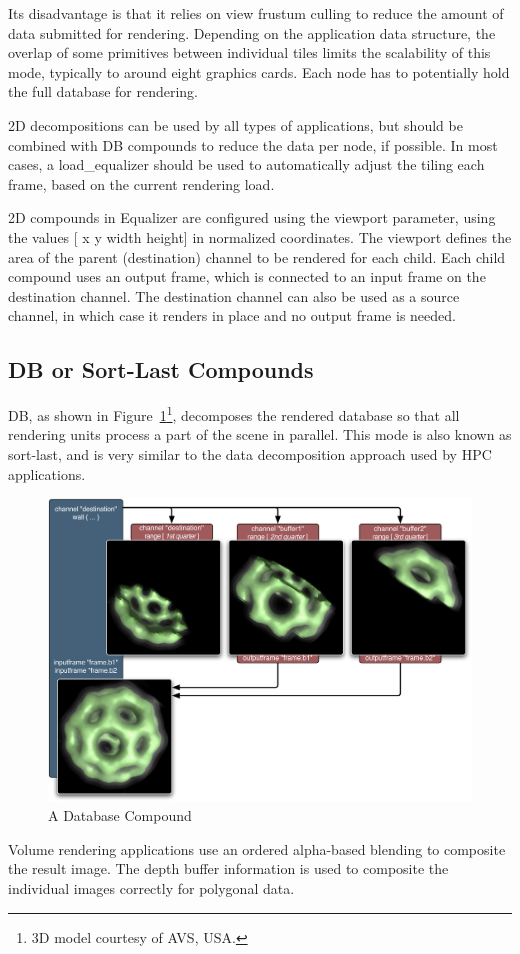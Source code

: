 \documentclass[10pt,a4]{scrartcl}
\newcommand{\fig}[1]{Figure~\ref{#1}}
\begin{document}
Its disadvantage is that it relies on view frustum culling to reduce the
amount of data submitted for rendering. Depending on the application
data structure, the overlap of some primitives between individual tiles
limits the scalability of this mode, typically to around eight graphics
cards. Each node has to potentially hold the full database for
rendering.

2D decompositions can be used by all types of applications, but should
be combined with DB compounds to reduce the data per node, if
possible. In most cases, a \textsf{load\_equalizer} should be used to
automatically adjust the tiling each frame, based on the current
rendering load.

2D compounds in Equalizer are configured using the \textsf{viewport}
parameter, using the values \textsf{[ x y width height]} in normalized
coordinates. The viewport defines the area of the parent (destination)
channel to be rendered for each child. Each child compound uses an
output frame, which is connected to an input frame on the destination
channel. The destination channel can also be used as a source channel,
in which case it renders in place and no output frame is needed.

\subsection{DB or Sort-Last Compounds}

DB, as shown in \fig{fDB}\footnote{3D model courtesy of AVS, USA.}, decomposes
the rendered database so that all rendering units process a part of the scene in
parallel. This mode is also known as sort-last, and is very similar to the data
decomposition approach used by HPC applications.

\begin{figure}
  \includegraphics[width=.618\textwidth]{images/DB.pdf}
  {\caption{\label{fDB}\small A Database Compound}}
\end{figure}
Volume rendering applications use an ordered alpha-based blending to
composite the result image. The depth buffer information is used to
composite the individual images correctly for polygonal data. 
\end{document}
